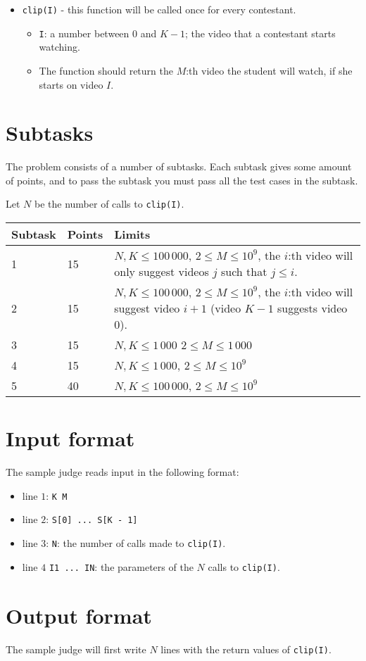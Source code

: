 \begin{itemize}
  \item \texttt{clip(I)} - this function will be called once for every contestant.
  \begin{itemize}
    \item \texttt{I}: a number between $0$ and $K - 1$; the video that a contestant starts watching.
		\item The function should return the $M$:th video the student will watch, if she starts on video $I$.
  \end{itemize}
\end{itemize}

\section*{Subtasks}
The problem consists of a number of subtasks. Each subtask gives some amount of points, and to pass
the subtask you must pass all the test cases in the subtask.

Let $N$ be the number of calls to \texttt{clip(I)}.
\begin{tabular}{|l|l|l|}
  \hline
  \textbf{Subtask} & \textbf{Points} & \textbf{Limits} \\ \hline
  1 & 15 & $N, K \le 100\,000$, $2 \le M \le 10^9$, the $i$:th video will only suggest videos $j$ such that $j \le i$. \\ \hline
  2 & 15 & $N, K \le 100\,000$, $2 \le M \le 10^9$, the $i$:th video will suggest video $i + 1$ (video $K - 1$ suggests video 0). \\ \hline
  3 & 15 & $N, K \le 1\,000$ $2 \le M \le 1\,000$ \\ \hline
  4 & 15 & $N, K \le 1\,000$, $2 \le M \le 10^9$ \\ \hline
  5 & 40 & $N, K \le 100\,000$, $2 \le M \le 10^9$ \\ \hline
\end{tabular}

\section*{Input format}
The sample judge reads input in the following format:

\begin{itemize}
  \item line $1$: \texttt{K M}
  \item line $2$: \texttt{S[0] ... S[K - 1]}
  \item line $3$: \texttt{N}: the number of calls made to \texttt{clip(I)}.
  \item line $4$ \texttt{I1 ... IN}: the parameters of the $N$ calls to \texttt{clip(I)}.
\end{itemize}

\section*{Output format}
The sample judge will first write $N$ lines with the return values of \texttt{clip(I)}.
